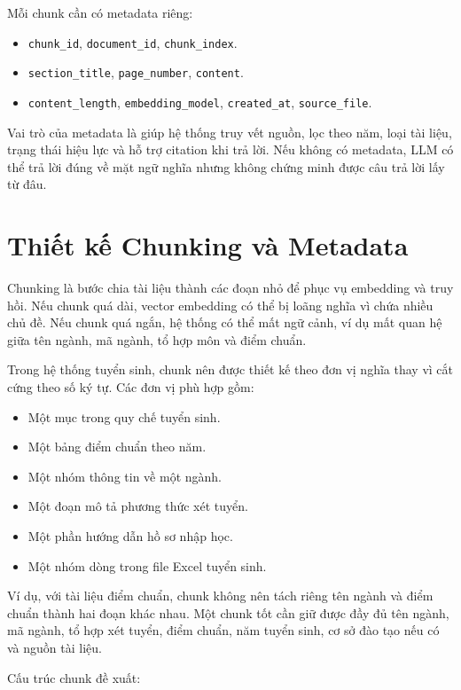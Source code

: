 \documentclass[12pt,a4paper]{report}
\begin{document}
Mỗi chunk cần có metadata riêng:

\begin{itemize}
    \item \texttt{chunk\_id}, \texttt{document\_id}, \texttt{chunk\_index}.
    \item \texttt{section\_title}, \texttt{page\_number}, \texttt{content}.
    \item \texttt{content\_length}, \texttt{embedding\_model}, \texttt{created\_at}, \texttt{source\_file}.
\end{itemize}

Vai trò của metadata là giúp hệ thống truy vết nguồn, lọc theo năm, loại tài liệu, trạng thái hiệu lực và hỗ trợ citation khi trả lời. Nếu không có metadata, LLM có thể trả lời đúng về mặt ngữ nghĩa nhưng không chứng minh được câu trả lời lấy từ đâu.

\section{Thiết kế Chunking và Metadata}

Chunking là bước chia tài liệu thành các đoạn nhỏ để phục vụ embedding và truy hồi. Nếu chunk quá dài, vector embedding có thể bị loãng nghĩa vì chứa nhiều chủ đề. Nếu chunk quá ngắn, hệ thống có thể mất ngữ cảnh, ví dụ mất quan hệ giữa tên ngành, mã ngành, tổ hợp môn và điểm chuẩn.

Trong hệ thống tuyển sinh, chunk nên được thiết kế theo đơn vị nghĩa thay vì cắt cứng theo số ký tự. Các đơn vị phù hợp gồm:

\begin{itemize}
    \item Một mục trong quy chế tuyển sinh.
    \item Một bảng điểm chuẩn theo năm.
    \item Một nhóm thông tin về một ngành.
    \item Một đoạn mô tả phương thức xét tuyển.
    \item Một phần hướng dẫn hồ sơ nhập học.
    \item Một nhóm dòng trong file Excel tuyển sinh.
\end{itemize}

Ví dụ, với tài liệu điểm chuẩn, chunk không nên tách riêng tên ngành và điểm chuẩn thành hai đoạn khác nhau. Một chunk tốt cần giữ được đầy đủ tên ngành, mã ngành, tổ hợp xét tuyển, điểm chuẩn, năm tuyển sinh, cơ sở đào tạo nếu có và nguồn tài liệu.

Cấu trúc chunk đề xuất:
\end{document}

